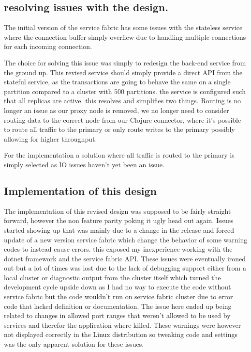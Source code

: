 \documentclass[a4paper,10pt,titlepage]{report}
\begin{document}
        

    \subsection{resolving issues with the design.}
    
    The initial version of the service fabric has some issues with the stateless service where the connection buffer simply overflew due to handling multiple connections for each incoming connection.

    The choice for solving this issue was simply to redesign the back-end service from the ground up. This revised service should simply provide a direct API from the stateful service, as the transactions are going to behave the same on a single partition compared to  a cluster with 500 partitions. the service is configured such that all replicas are active. this resolves and simplifies two things.  Routing is no longer an issue as our proxy node is removed, we no longer need to consider routing data to the correct node from our Clojure connector, where it's possible to route all traffic to the primary or only route writes to the primary possibly allowing for higher throughput.

    For the implementation a solution where all traffic is routed to the primary is simply selected as IO issues haven't yet been an issue.

    \subsection{Implementation of this design}

    The implementation of this revised design was supposed to be fairly straight forward, however the non feature parity poking it ugly head out again. Issues started showing up that was mainly due to a change in the release and forced update of a new version service fabric which change the behavior of some warning codes to instead cause errors. this exposed my inexperience working with the dotnet framework and the service fabric API. These issues were eventually ironed out but a lot of times was lost due to the lack of debugging support either from a local cluster or diagnostic output from the cluster itself which turned the development cycle upside down as I had no way to execute the code without service fabric but the code wouldn't run on service fabric cluster due to error code that lacked definition or documentation. The issue here ended up being related to changes in allowed port ranges that weren't allowed to be used by services and therefor the application where killed. These warnings were however not displayed correctly in the Linux distribution so tweaking code and settings was the only apparent solution for these issues.
\end{document}
